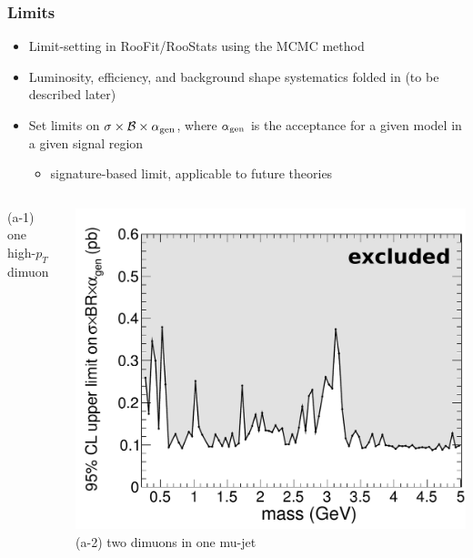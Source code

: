 \documentclass[compress]{beamer}
\newcommand{\s}[1]{{\mbox{\scriptsize #1}}}
\begin{document}
\begin{frame}
\frametitle{Limits}
\begin{itemize}
\item Limit-setting in RooFit/RooStats using the MCMC method
\item Luminosity, efficiency, and background shape systematics folded
  in (to be described later)
\item Set limits on $\sigma \times \mathcal{B} \times \alpha_\s{gen}$,
  where $\alpha_\s{gen}$ is the acceptance for a given model in a
  given signal region
\begin{itemize}
\item signature-based limit, applicable to future theories
\end{itemize}
\end{itemize}

\vfill
\begin{columns}
\centering (a-1) one high-$p_T$ dimuon

\includegraphics[width=\linewidth]{ul__sig_a1_n4.pdf}
\centering (a-2) two dimuons in one mu-jet


\end{columns}
\end{frame}
\end{document}
